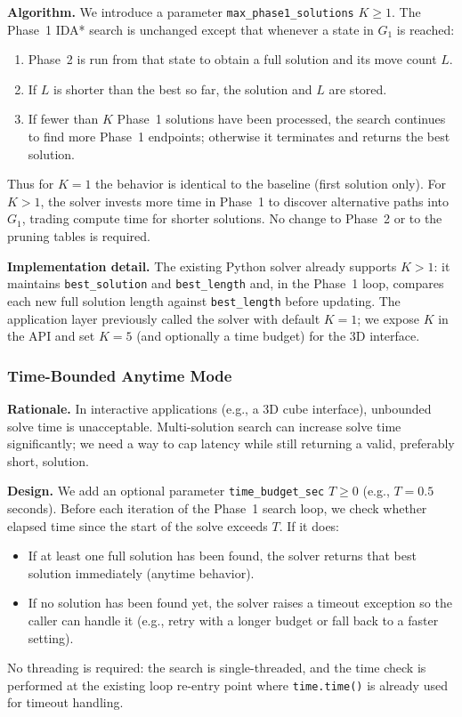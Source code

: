 \documentclass[10pt,twocolumn,a4paper]{article}
\begin{document}
\textbf{Algorithm.} We introduce a parameter \texttt{max\_phase1\_solutions} $K \geq 1$. The Phase~1 IDA* search is unchanged except that whenever a state in $G_1$ is reached:
\begin{enumerate}
  \item Phase~2 is run from that state to obtain a full solution and its move count $L$.
  \item If $L$ is shorter than the best so far, the solution and $L$ are stored.
  \item If fewer than $K$ Phase~1 solutions have been processed, the search continues to find more Phase~1 endpoints; otherwise it terminates and returns the best solution.
\end{enumerate}
Thus for $K=1$ the behavior is identical to the baseline (first solution only). For $K>1$, the solver invests more time in Phase~1 to discover alternative paths into $G_1$, trading compute time for shorter solutions. No change to Phase~2 or to the pruning tables is required.

\textbf{Implementation detail.} The existing Python solver already supports $K>1$: it maintains \texttt{best\_solution} and \texttt{best\_length} and, in the Phase~1 loop, compares each new full solution length against \texttt{best\_length} before updating. The application layer previously called the solver with default $K=1$; we expose $K$ in the API and set $K=5$ (and optionally a time budget) for the 3D interface.

\subsubsection{Time-Bounded Anytime Mode}
\label{sec:anytime}

\textbf{Rationale.} In interactive applications (e.g., a 3D cube interface), unbounded solve time is unacceptable. Multi-solution search can increase solve time significantly; we need a way to cap latency while still returning a valid, preferably short, solution.

\textbf{Design.} We add an optional parameter \texttt{time\_budget\_sec} $T \geq 0$ (e.g., $T = 0.5$ seconds). Before each iteration of the Phase~1 search loop, we check whether elapsed time since the start of the solve exceeds $T$. If it does:
\begin{itemize}
  \item If at least one full solution has been found, the solver returns that best solution immediately (anytime behavior).
  \item If no solution has been found yet, the solver raises a timeout exception so the caller can handle it (e.g., retry with a longer budget or fall back to a faster setting).
\end{itemize}
No threading is required: the search is single-threaded, and the time check is performed at the existing loop re-entry point where \texttt{time.time()} is already used for timeout handling.
\end{document}
